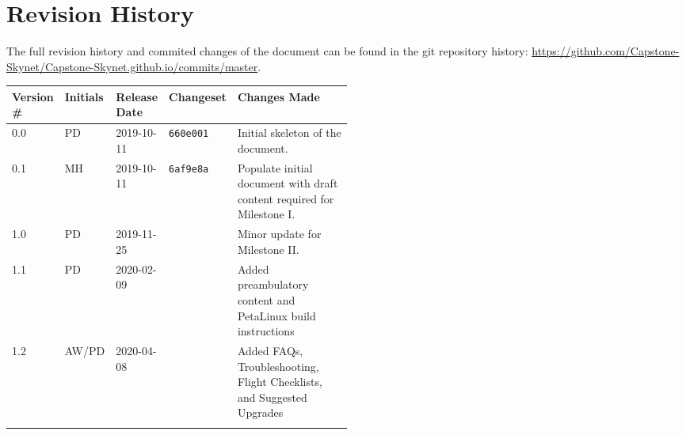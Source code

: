 \section*{Revision History}
The full revision history and commited changes of the document can be found in the git repository history: \href{https://github.com/Capstone-Skynet/Capstone-Skynet.github.io}{https://github.com/Capstone-Skynet/Capstone-Skynet.github.io/commits/master}.

\begin{table}[H]
\begin{tabular}{*{4}{l}p{0.5\linewidth}}
\hline
Version \# & Initials & Release Date & Changeset & Changes Made \\ \hline

0.0 & PD & 2019-10-11 & \texttt{660e001} & Initial skeleton of the document.\\
0.1 & MH & 2019-10-11 & \texttt{6af9e8a} & Populate initial document with draft content required for Milestone I.\\
1.0 & PD & 2019-11-25 &  & Minor update for Milestone II.\\
1.1 & PD & 2020-02-09 &  & Added preambulatory content and PetaLinux build instructions \\
1.2 & AW/PD & 2020-04-08 &  & Added FAQs, Troubleshooting, Flight Checklists, and Suggested Upgrades \\


 & & & \\ \hline
\end{tabular}
\end{table}